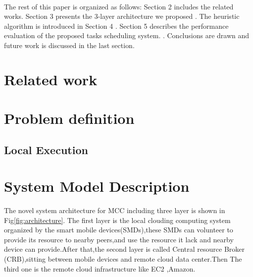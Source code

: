 \documentclass[review]{elsarticle}
\begin{document}
\paragraph{}  
    The rest of this paper is organized as follows: Section 2 includes the related works. Section 3 presents the 3-layer architecture we proposed . The heuristic algorithm is introduced in Section 4 . Section 5 describes the performance evaluation of the proposed tasks scheduling system. . Conclusions are drawn and future work is discussed in the last section.

\section{Related work}
\section{Problem definition}
     \subsection{Local Execution} 
     
\section{System Model Description}
    \paragraph{} 
    The novel system architecture for MCC including three layer is shown in Fig\ref{fig:architecture}. The first layer is the local clouding computing system organized by the smart mobile devices(SMDs),these SMDs can volunteer to provide its resource to nearby peers,and use the resource it lack and nearby device can provide.After that,the second layer is called Central resource Broker (CRB),sitting between mobile devices and remote cloud data center.Then The third one is the remote cloud infrastructure like EC2 ,Amazon.
    
\end{document}
